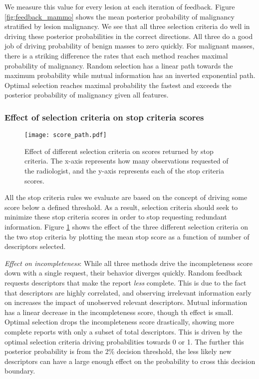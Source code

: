 We measure this value for every lesion at each iteration of feedback. Figure \ref{fig:feedback_mammo} shows the mean posterior probability of malignancy stratified by lesion malignancy. We see that all three selection criteria do well in driving these posterior probabilities in the correct directions. All three do a good job of driving probability of benign masses to zero quickly. For malignant masses, there is a striking difference the rates that each method reaches maximal probability of malignancy. Random selection has a linear path towards the maximum probability while mutual information has an inverted exponential path. Optimal selection reaches maximal probability the fastest and exceeds the posterior probability of malignancy given all features.

\subsubsection{Effect of selection criteria on stop criteria scores}

\begin{figure}[h]
	\centering
	\texttt{[image: score\_path.pdf]}
	\caption[Effect of selection criteria on stop criteria scores]{Effect of different selection criteria on scores returned by stop criteria. The x-axis represents how many observations requested of the radiologist, and the y-axis represents each of the stop criteria scores.}
	\label{fig:feedback_score_path}
\end{figure} 

All the stop criteria rules we evaluate are based on the concept of driving some score below a defined threshold. As a result, selection criteria should seek to minimize these stop criteria scores in order to stop requesting redundant information. Figure \ref{fig:feedback_score_path} shows the effect of the three different selection criteria on the two stop criteria by plotting the mean stop score as a function of number of descriptors selected.

\emph{Effect on incompleteness}:
While all three methods drive the incompleteness score down with a single request, their behavior diverges quickly. Random feedback requests descriptors that make the report \emph{less} complete. This is due to the fact that descriptors are highly correlated, and observing irrelevant information early on increases the impact of unobserved relevant descriptors. Mutual information has a linear decrease in the incompleteness score, though th effect is small. Optimal selection drops the incompleteness score drastically, showing more complete reports with only a subset of total descriptors. This is driven by the optimal selection criteria driving probabilities towards 0 or 1. The further this posterior probability is from the 2\% decision threshold, the less likely new descriptors can have a large enough effect on the probability to cross this decision boundary.

